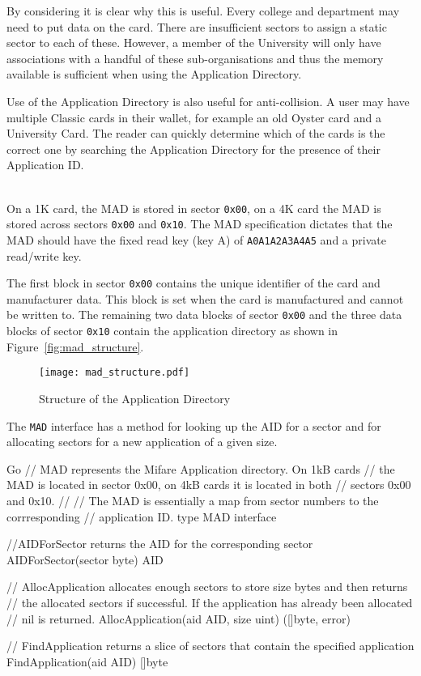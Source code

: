 \documentclass[dissertation.tex]{subfiles}
\begin{document}
  By considering \UoC{} it is clear why this is useful. Every college and department may need to put data on the card. There are insufficient sectors to assign a static sector to each of these. However, a member of the University will only have associations with a handful of these sub-organisations and thus the memory available is sufficient when using the Application Directory.

  Use of the Application Directory is also useful for anti-collision. A user may have multiple \mifare{} Classic cards in their wallet, for example an old Oyster card and a University Card. The reader can quickly determine which of the cards is the correct one by searching the Application Directory for the presence of their Application ID.\@

   \\
  On a 1K card, the MAD is stored in sector \texttt{0x00}, on a 4K card the MAD is stored across sectors \texttt{0x00} and \texttt{0x10}. The MAD specification dictates that the MAD should have the fixed read key (key A) of \texttt{A0A1A2A3A4A5} and a private read/write key.

  The first block in sector \texttt{0x00} contains the unique identifier of the card and manufacturer data. This block is set when the card is manufactured and cannot be written to. The remaining two data blocks of sector \texttt{0x00} and the three data blocks of sector \texttt{0x10} contain the application directory as shown in Figure~\vref{fig:mad_structure}.

  \begin{figure}[h]
    \centering
    \texttt{[image: mad\_structure.pdf]}
    \caption{Structure of the \mifare{} Application Directory}\label{fig:mad_structure}
  \end{figure}

  The \texttt{MAD} interface has a method for looking up the AID for a sector and for allocating sectors for a new application of a given size.

  \begin{code}[numbers=none]{Go}
    // MAD represents the Mifare Application directory. On 1kB cards
    // the MAD is located in sector 0x00, on 4kB cards it is located in both
    // sectors 0x00 and 0x10.
    //
    // The MAD is essentially a map from sector numbers to the corrresponding
    // application ID.
    type MAD interface {
    	//AIDForSector returns the AID for the corresponding sector
    	AIDForSector(sector byte) AID

    	// AllocApplication allocates enough sectors to store size bytes and then returns
    	// the allocated sectors if successful. If the application has already been allocated
    	// nil is returned.
    	AllocApplication(aid AID, size uint) ([]byte, error)

      // FindApplication returns a slice of sectors that contain the specified application
      FindApplication(aid AID) []byte
    }
  \end{code}
\end{document}
